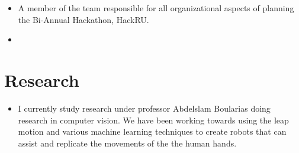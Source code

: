 \documentclass[12pt,a4paper,sans]{moderncv} %
\begin{document}
\begin{itemize}
\item{ {}{ {A member of the team responsible for } }{all organizational aspects of planning the Bi-Annual Hackathon, HackRU.}}

\item{}

\vspace{2pt}

\end{itemize}

\vspace{6pt}


\section{Research}
\vspace{6pt}
\begin{itemize}
\item{I currently study research under professor Abdelslam Boularias doing research in computer vision. We have been working towards using the leap motion and various machine learning techniques to create robots that can assist and replicate the movements of the the human hands.}
\end{itemize}

\iffalse %

\section{Interests}
\vspace{6pt}
\begin{itemize}
\item{I have been trained in singing for over seven years. Being in numerous choral groups I've traveled on tour to multiple cities on the east coast for performances and competitions such as Chicago, Illinois, and more recently Baltimore, Maryland. I also study Judo and have competed in multiple competitive tournaments with the Rutgers University Judo Team.} 

\item{In high school I performed in four years of Musical and Improvisational Comedic Theater, having placed in the top 5 in the STANJ competition for Comedic Scenes. I was also on the varsity soccer team for three years.}

\end{itemize}
\fi

 



\nocite{*}

         
\end{document}
